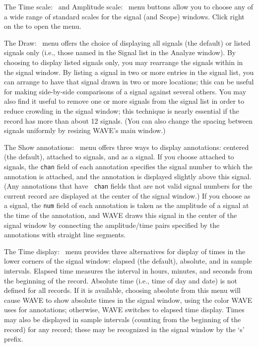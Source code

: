 \documentclass[twoside]{book}
\newcommand{\keycap}[1]{\cornersize{.5}\Ovalbox{\small\sf #1}}
\newcommand{\button}[1]{\cornersize{2}\ovalbox{\rule[-.3mm]{0cm}{2.5mm}\small\sf ~#1~}}
\newcommand{\amenubutton}[1]{{\sf #1}~\keycap{\ensuremath{\nabla}}}
\newcommand{\WAVE}{{\sf WAVE}\xspace}
\begin{document}
The \amenubutton{Time scale:} and \amenubutton{Amplitude scale:}
menu buttons allow you to choose any of a wide range of standard
scales for the signal (and {\sf Scope}) windows.  Click right on
the \button{$\nabla$} to open the menu.

The \amenubutton{Draw:} menu offers the choice of displaying {\sf all
signals} (the default) or {\sf listed signals only} (i.e., those named
in the {\sf Signal list} in the {\sf Analyze} window).  By choosing to
display {\sf listed signals only}, you may rearrange the signals
within in the signal window.  By listing a signal in two or more
entries in the signal list, you can arrange to have that signal drawn
in two or more locations;  this can be useful for making side-by-side
comparisons of a signal against several others.  You may also find
it useful to remove one or more signals from the signal list in order
to reduce crowding in the signal window;  this technique is nearly essential
if the record has more than about 12 signals.  (You can also change
the spacing between signals uniformly by resizing \WAVE{}'s main window.)

The \amenubutton{Show annotations:} menu offers three ways to display
annotations: {\sf centered} (the default),  {\sf attached to signals},
and {\sf as a signal}.  If you choose {\sf attached to signals}, the
{\tt chan} field of each annotation specifies the signal number to
which the annotation is attached, and the annotation is displayed
slightly above this signal.  (Any annotations that have {\tt
chan} fields that are not valid signal numbers for the current record
are displayed at the center of the signal window.)  If you choose {\sf
as a signal}, the {\tt num} field of each annotation is taken as the
amplitude of a signal at the time of the annotation, and \WAVE{} draws
this signal in the center of the signal window by connecting the
amplitude/time pairs specified by the annotations with straight line
segments.

The \amenubutton{Time display:} menu provides three alternatives for
display of times in the lower corners of the signal window: {\sf
elapsed} (the default), {\sf absolute}, and {\sf in sample intervals}.
Elapsed time measures the interval in hours, minutes, and seconds from
the beginning of the record.  Absolute time (i.e., time of day and
date) is not defined for all records.  If it is available, choosing
{\sf absolute} from this menu will cause \WAVE{} to show absolute times
in the signal window, using the color \WAVE{} uses for annotations;
otherwise, \WAVE{} switches to {\sf elapsed} time display.  Times may
also be displayed {\sf in sample intervals} (counting from the
beginning of the record) for any record;  these may
be recognized in the signal window by the `{\sf s}' prefix.
\end{document}

